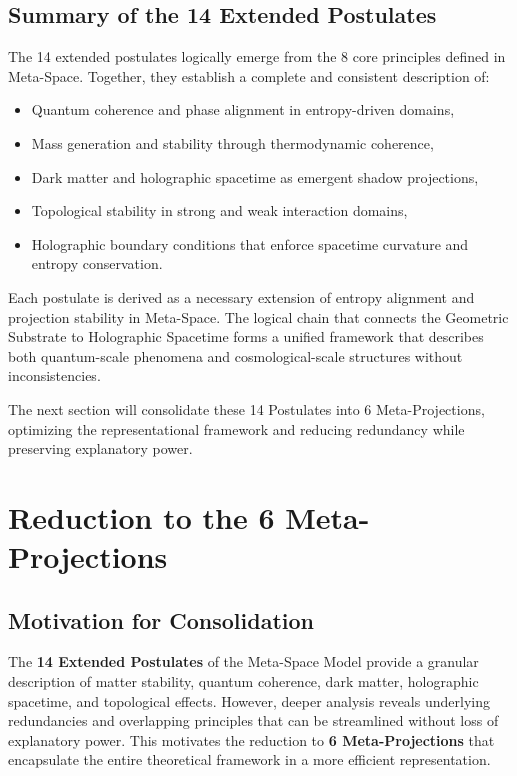 \documentclass[10.5pt,a4paper]{article}
\begin{document}
\subsection{Summary of the 14 Extended Postulates}

The 14 extended postulates logically emerge from the 8 core principles defined in Meta-Space. Together, they 
establish a complete and consistent description of:

\begin{itemize}
  \item Quantum coherence and phase alignment in entropy-driven domains,
  \item Mass generation and stability through thermodynamic coherence,
  \item Dark matter and holographic spacetime as emergent shadow projections,
  \item Topological stability in strong and weak interaction domains,
  \item Holographic boundary conditions that enforce spacetime curvature and entropy conservation.
\end{itemize}

Each postulate is derived as a necessary extension of entropy alignment and projection stability in Meta-Space. 
The logical chain that connects the Geometric Substrate to Holographic Spacetime forms a unified framework 
that describes both quantum-scale phenomena and cosmological-scale structures without inconsistencies.

The next section will consolidate these 14 Postulates into 6 Meta-Projections, optimizing the representational 
framework and reducing redundancy while preserving explanatory power.

\clearpage

\section{Reduction to the 6 Meta-Projections}

\subsection{Motivation for Consolidation}

The \textbf{14 Extended Postulates} of the Meta-Space Model provide a granular description of matter stability, quantum coherence, dark matter, holographic spacetime, and topological effects. However, deeper analysis reveals underlying redundancies and overlapping principles that can be streamlined without loss of explanatory power. This motivates the reduction to \textbf{6 Meta-Projections} that encapsulate the entire theoretical framework in a more efficient representation.
\end{document}

